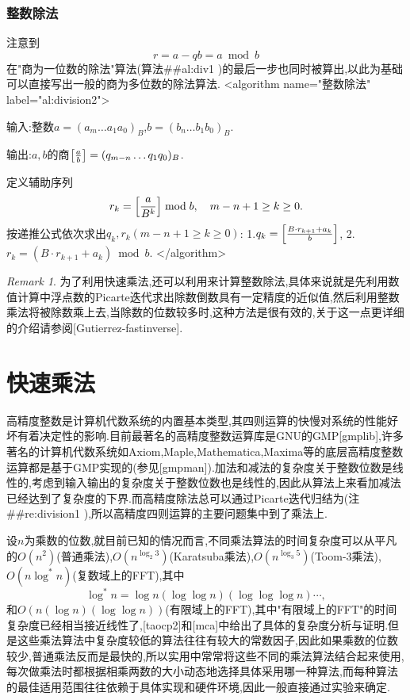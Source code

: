 \documentclass{ctexart}
\newcommand\mtcasCite[1]{[#1]}
\theoremstyle{remark}
\newtheorem{remark}{Remark}
\theoremstyle{definition}
\begin{document}
\subsubsection{整数除法}

注意到$$r=a-qb=a\bmod b$$在"商为一位数的除法"算法(算法##al:div1
)的最后一步也同时被算出,以此为基础可以直接写出一般的商为多位数的除法算法.
<algorithm  name="整数除法" label="al:division2">

输入:整数$a=(a_m\ldots a_1a_0)_B$,$b=(b_n\ldots b_1b_0)_B$.

输出:$a,b$的商$\left[{a\over b}\right]=(q_{m-n}\ldots q_1q_0)_B$.

定义辅助序列$$r_k=\left[{a\over B^k}\right]\bmod b,\quad m-n+1\ge k\ge 0.$$
按递推公式依次求出$q_k,r_k(m-n+1\ge k\ge 0)$:
 1.$q_k=\left[{B\cdot r_{k+1}+a_k\over b}\right]$,
 2.$r_k=(B\cdot r_{k+1}+a_k)\bmod b$.
</algorithm>
\begin{remark}\label{re:division1}
为了利用快速乘法,还可以利用来计算整数除法,具体来说就是先利用数值计算中浮点数的Picarte迭代求出除数倒数具有一定精度的近似值,然后利用整数乘法将被除数乘上去,当除数的位数较多时,这种方法是很有效的,关于这一点更详细的介绍请参阅\mtcasCite{Gutierrez-fastinverse}.
\end{remark}

\section{快速乘法}

高精度整数是计算机代数系统的内置基本类型,其四则运算的快慢对系统的性能好坏有着决定性的影响.目前最著名的高精度整数运算库是GNU的GMP\mtcasCite{gmplib},许多著名的计算机代数系统如Axiom,Maple,Mathematica,Maxima等的底层高精度整数运算都是基于GMP实现的(参见\mtcasCite{gmpman}).加法和减法的复杂度关于整数位数是线性的,考虑到输入输出的复杂度关于整数位数也是线性的,因此从算法上来看加减法已经达到了复杂度的下界.而高精度除法总可以通过Picarte迭代归结为(注##re:division1
),所以高精度四则运算的主要问题集中到了乘法上.

设$n$为乘数的位数,就目前已知的情况而言,不同乘法算法的时间复杂度可以从平凡的$O(n^2)$(普通乘法),$O(n^{\log_2{3}})$(Karatsuba乘法),$O(n^{\log_3{5}})$(Toom-3乘法),$O(n\log^*{n})$(复数域上的FFT),其中$$\log^*{n}=\log{n}(\log{\log{n}})(\log{\log{\log{n}}})\cdots,$$和$O(n(\log{n})(\log{\log{n}}))$(有限域上的FFT),其中"有限域上的FFT"的时间复杂度已经相当接近线性了,\mtcasCite{taocp2}和\mtcasCite{mca}中给出了具体的复杂度分析与证明.但是这些乘法算法中复杂度较低的算法往往有较大的常数因子,因此如果乘数的位数较少,普通乘法反而是最快的,所以实用中常常将这些不同的乘法算法结合起来使用,每次做乘法时都根据相乘两数的大小动态地选择具体采用哪一种算法,而每种算法的最佳适用范围往往依赖于具体实现和硬件环境,因此一般直接通过实验来确定.
\end{document}
